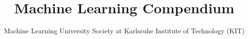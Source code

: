 \title{Machine Learning Compendium}
\author{Machine Learning University Society at Karlsruhe Institute of Technology (KIT)}







